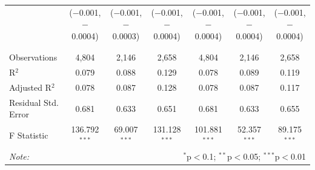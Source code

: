 \documentclass[alpha-refs]{wiley-article-01g}
\begin{document}
\begin{landscape}
\begin{table}[!htbp]
\begin{tabular}{@{\extracolsep{5pt}}lcccccc}
			& ($-$0.001, $-$0.0004) & ($-$0.001, $-$0.0003) & ($-$0.001, $-$0.0004) & ($-$0.001, $-$0.0004) & ($-$0.001, $-$0.0004) & ($-$0.001, $-$0.0004) \\ 
			& & & & & & \\ 
			\hline \\[-.8ex] 
			Observations & 4,804 & 2,146 & 2,658 & 4,804 & 2,146 & 2,658 \\ 
			R$^{2}$ & 0.079 & 0.088 & 0.129 & 0.078 & 0.089 & 0.119 \\ 
			Adjusted R$^{2}$ & 0.078 & 0.087 & 0.128 & 0.078 & 0.087 & 0.117 \\ 
			Residual Std. Error & 0.681 & 0.633 & 0.651 & 0.681 & 0.633 & 0.655 \\ 
			F Statistic & 136.792$^{***}$ & 69.007$^{***}$ & 131.128$^{***}$ & 101.881$^{***}$ & 52.357$^{***}$ & 89.175$^{***}$ \\ 
			\hline 
			\textit{Note:}  & \multicolumn{6}{r}{$^{*}$p$<$0.1; $^{**}$p$<$0.05; $^{***}$p$<$0.01} \\ 
		\end{tabular} 
	\end{table} 
	
\end{landscape}

\newpage
\end{document}
